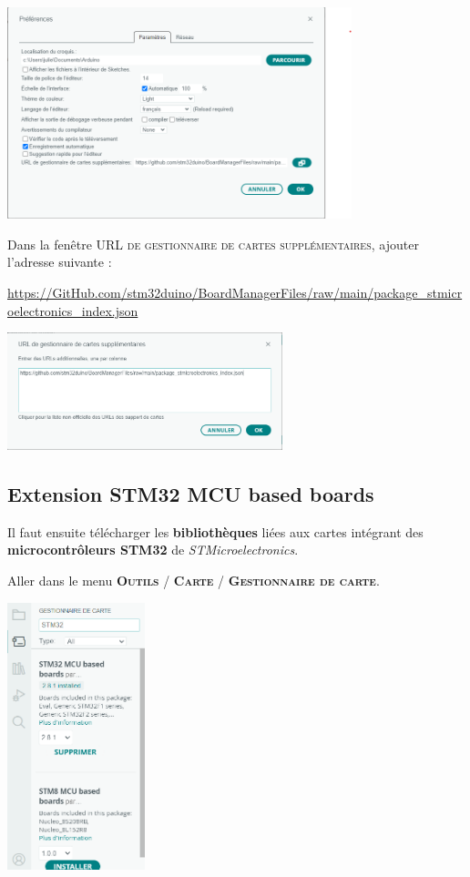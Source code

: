 \documentclass[a4paper,11pt,titlepage]{article} %
\begin{document}
\begin{center}
	\includegraphics[width=0.75\textwidth]{images/arduino_preferences.png}
\end{center}

Dans la fenêtre \textsc{URL de gestionnaire de cartes supplémentaires}, ajouter l'adresse suivante :

\href{https://GitHub.com/stm32duino/BoardManagerFiles/raw/main/package_stmicroelectronics_index.json}{https://GitHub.com/stm32duino/BoardManagerFiles/raw/main/package\_stmicroelectronics\_index.json}

\begin{center}
	\includegraphics[width=0.6\textwidth]{images/arduino_preferences_url.png}
\end{center}

\subsection{Extension STM32 MCU based boards}

Il faut ensuite télécharger les \textbf{bibliothèques} liées aux cartes intégrant des \textbf{microcontrôleurs STM32} de \textit{STMicroelectronics}.

Aller dans le menu \textsc{\textbf{Outils} / \textbf{Carte} / \textbf{Gestionnaire de carte}}. 

\begin{center}
	\includegraphics[width=0.3\textwidth]{images/arduino_gestion_cartes.png}
\end{center}
\end{document}
